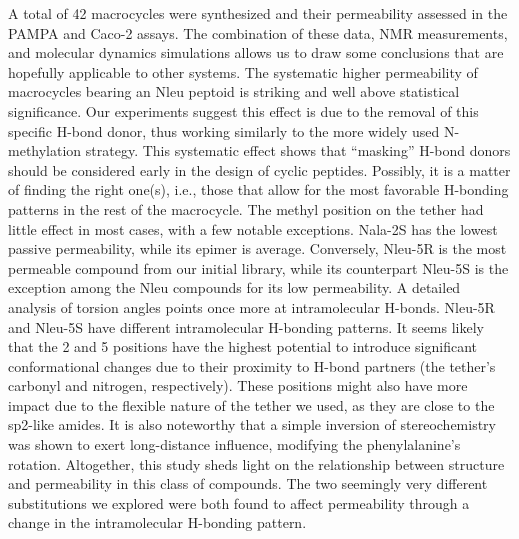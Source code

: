 A total of 42 macrocycles were synthesized and their permeability assessed in the PAMPA and Caco-2 assays. The combination of these data, NMR measurements, and molecular dynamics simulations allows us to draw some conclusions that are hopefully applicable to other systems. The systematic higher permeability of macrocycles bearing an Nleu peptoid is striking and well above statistical significance. Our experiments suggest this effect is due to the removal of this specific H-bond donor, thus working similarly to the more widely used N-methylation strategy. This systematic effect shows that “masking” H-bond donors should be considered early in the design of cyclic peptides. Possibly, it is a matter of finding the right one(s), i.e., those that allow for the most favorable H-bonding patterns in the rest of the macrocycle.
The methyl position on the tether had little effect in most cases, with a few notable exceptions. Nala-2S has the lowest passive permeability, while its epimer is average. Conversely, Nleu-5R is the most permeable compound from our initial library, while its counterpart Nleu-5S is the exception among the Nleu compounds for its low permeability. A detailed analysis of torsion angles points once more at intramolecular H-bonds. Nleu-5R and Nleu-5S have different intramolecular H-bonding patterns. It seems likely that the 2 and 5 positions have the highest potential to introduce significant conformational changes due to their proximity to H-bond partners (the tether’s carbonyl and nitrogen, respectively). These positions might also have more impact due to the flexible nature of the tether we used, as they are close to the sp2-like amides. It is also noteworthy that a simple inversion of stereochemistry was shown to exert long-distance influence, modifying the phenylalanine’s rotation.
Altogether, this study sheds light on the relationship between structure and permeability in this class of compounds. The two seemingly very different substitutions we explored were both found to affect permeability through a change in the intramolecular H-bonding pattern.